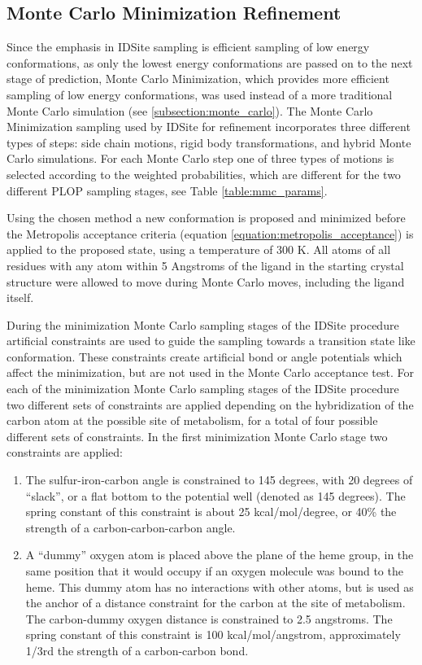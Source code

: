 \subsection{Monte Carlo Minimization Refinement}
\label{subsection:p450/mcm}
Since the emphasis in IDSite sampling is efficient sampling of low energy conformations, as only the lowest energy conformations are passed on to the next stage of prediction, Monte Carlo Minimization, which provides more efficient sampling of low energy conformations, was used instead of a more traditional Monte Carlo simulation (see \ref{subsection:monte_carlo}).
The Monte Carlo Minimization sampling used by IDSite for refinement incorporates three different types of steps: side chain motions, rigid body transformations, and hybrid Monte Carlo simulations.
For each Monte Carlo step one of three types of motions is selected according to the weighted probabilities, which are different for the two different PLOP sampling stages, see Table \ref{table:mmc_params}.

Using the chosen method a new conformation is proposed and minimized before the Metropolis acceptance criteria (equation \ref{equation:metropolis_acceptance}) is applied to the proposed state, using a temperature of 300 K.
All atoms of all residues with any atom within 5 Angstroms of the ligand in the starting crystal structure were allowed to move during Monte Carlo moves, including the ligand itself.

During the minimization Monte Carlo sampling stages of the IDSite procedure artificial constraints are used to guide the sampling towards a transition state like conformation.
These constraints create artificial bond or angle potentials which affect the minimization, but are not used in the Monte Carlo acceptance test.
For each of the minimization Monte Carlo sampling stages of the IDSite procedure two different sets of constraints are applied depending on the hybridization of the carbon atom at the possible site of metabolism, for a total of four possible different sets of constraints.
In the first minimization Monte Carlo stage two constraints are applied:
\begin{enumerate}
\item The sulfur-iron-carbon angle is constrained to 145 degrees, with 20 degrees of ``slack'', or a flat bottom to the potential well (denoted as 145 degrees).
The spring constant of this constraint is about 25 kcal/mol/degree, or {\textapprox}40\% the strength of a carbon-carbon-carbon angle.
\item A ``dummy'' oxygen atom is placed above the plane of the heme group, in the same position that it would occupy if an oxygen molecule was bound to the heme.  
This dummy atom has no interactions with other atoms, but is used as the anchor of a distance constraint for the carbon at the site of metabolism.  
The carbon-dummy oxygen distance is constrained to 2.5 angstroms.
The spring constant of this constraint is 100 kcal/mol/angstrom, approximately 1/3rd the strength of a carbon-carbon bond.
\end{enumerate}

